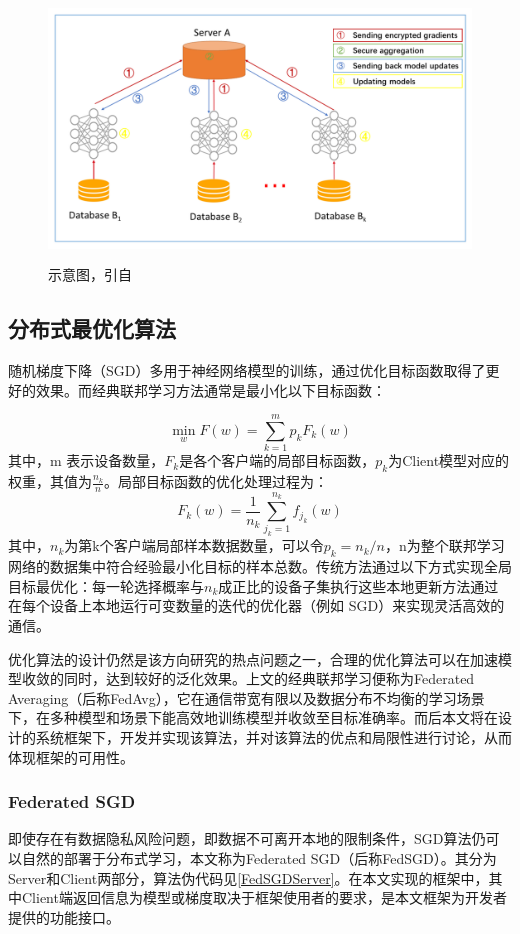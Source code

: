 \documentclass[zihao = -4,cn]{oucart}
\begin{document}
\begin{figure}[h]
	\centering %
	\includegraphics[width=12cm,height=7cm]{assets/fed}
	\caption{示意图，引自\cite{yang2019federated}}
	\label{fig:MLP}
\end{figure}

\subsection{分布式最优化算法}
随机梯度下降（SGD）多用于神经网络模型的训练，通过优化目标函数取得了更好的效果。而经典联邦学习方法通常是最小化以下目标函数：\par
\begin{equation} \label{eqa:fed}
\min_{w} F(w) = \sum_{k=1}^{m}{p_k F_k(w)}
\end{equation}
其中，m 表示设备数量，$F_k$是各个客户端的局部目标函数，$p_k$为Client模型对应的权重，其值为$\frac{n_k}{n}$。局部目标函数的优化处理过程为：
\begin{equation}
F_k(w) = \frac{1}{n_k}\sum_{j_k=1}^{n_k}{f_{j_k}(w)}
\end{equation}
其中，$n_k$为第k个客户端局部样本数据数量，可以令$p_k=n_k/n$，n为整个联邦学习网络的数据集中符合经验最小化目标的样本总数。传统方法通过以下方式实现全局目标最优化：每一轮选择概率与$n_k$成正比的设备子集执行这些本地更新方法通过在每个设备上本地运行可变数量的迭代的优化器（例如 SGD）来实现灵活高效的通信。\par
优化算法的设计仍然是该方向研究的热点问题之一，合理的优化算法可以在加速模型收敛的同时，达到较好的泛化效果。上文的经典联邦学习便称为Federated Averaging（后称FedAvg）\cite{mcmahan2016communication}，它在通信带宽有限以及数据分布不均衡的学习场景下，在多种模型和场景下能高效地训练模型并收敛至目标准确率。而后本文将在设计的系统框架下，开发并实现该算法，并对该算法的优点和局限性进行讨论，从而体现框架的可用性。

\subsubsection{Federated SGD}
即使存在有数据隐私风险问题，即数据不可离开本地的限制条件，SGD算法仍可以自然的部署于分布式学习，本文称为Federated SGD（后称FedSGD）。其分为Server和Client两部分，算法伪代码见\ref{FedSGDServer}。在本文实现的框架中，其中Client端返回信息为模型或梯度取决于框架使用者的要求，是本文框架为开发者提供的功能接口。\par
\end{document}
